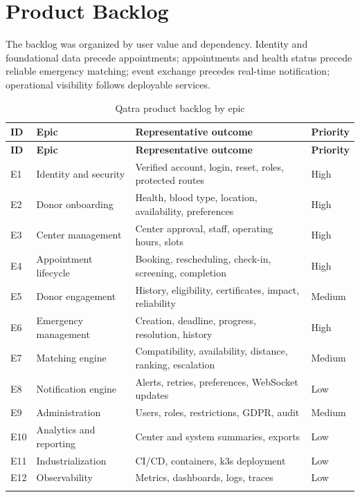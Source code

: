 \section{Product Backlog}
The backlog was organized by user value and dependency. Identity and foundational data precede appointments; appointments and health status precede reliable emergency matching; event exchange precedes real-time notification; operational visibility follows deployable services.

\begin{longtable}{|P{1.4cm}|P{3.6cm}|P{6.8cm}|P{2.0cm}|}
\hline
{}\textbf{ID} & \textbf{Epic} & \textbf{Representative outcome} & \textbf{Priority}\\ \hline
\endfirsthead
\hline{}\textbf{ID} & \textbf{Epic} & \textbf{Representative outcome} & \textbf{Priority}\\ \hline
\endhead
E1 & Identity and security & Verified account, login, reset, roles, protected routes & High\\ \hline
E2 & Donor onboarding & Health, blood type, location, availability, preferences & High\\ \hline
E3 & Center management & Center approval, staff, operating hours, slots & High\\ \hline
E4 & Appointment lifecycle & Booking, rescheduling, check-in, screening, completion & High\\ \hline
E5 & Donor engagement & History, eligibility, certificates, impact, reliability & Medium\\ \hline
E6 & Emergency management & Creation, deadline, progress, resolution, history & High\\ \hline
E7 & Matching engine & Compatibility, availability, distance, ranking, escalation & Medium\\ \hline
E8 & Notification engine & Alerts, retries, preferences, WebSocket updates & Low\\ \hline
E9 & Administration & Users, roles, restrictions, GDPR, audit & Medium\\ \hline
E10 & Analytics and reporting & Center and system summaries, exports & Low\\ \hline
E11 & Industrialization & CI/CD, containers, k3s deployment & Low\\ \hline
E12 & Observability & Metrics, dashboards, logs, traces & Low\\ \hline
\caption{Qatra product backlog by epic}
\label{tab:backlog}
\end{longtable}

